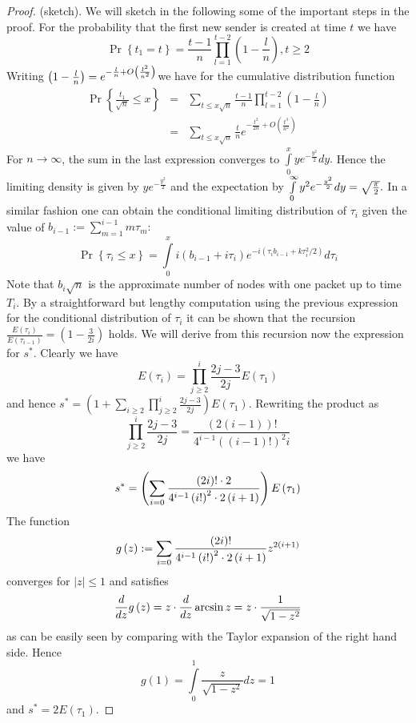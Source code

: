 \begin{proof}
(sketch). We will sketch in the following some of the important steps in the
proof. For the probability that the first new sender is created at time $t$
we have%
\[
\Pr \left\{ t_{1}=t\right\} =\frac{t-1}{n}\prod\limits_{l=1}^{t-2}\left( 1-%
\frac{l}{n}\right) ,t\geq 2
\]%
Writing $\left( 1-\frac{l}{n}\right) =e^{-\frac{l}{n}+O\left( \frac{l^{2}}{%
n^{2}}\right) }$we have for the cumulative distribution function 
\begin{eqnarray*}
\Pr \left\{ \frac{t_{1}}{\sqrt{n}}\leq x\right\}  &=&\sum\limits_{t\leq x%
\sqrt{n}}\frac{t-1}{n}\prod\limits_{l=1}^{t-2}\left( 1-\frac{l}{n}\right)  \\
&=&\sum\limits_{t\leq x\sqrt{n}}\frac{t}{n}e^{-\frac{t^{2}}{2n}+O\left( 
\frac{t^{3}}{n^{2}}\right) }
\end{eqnarray*}%
For $n\rightarrow \infty $, the sum in the last expression converges to $%
\int\limits_{0}^{x}ye^{-\frac{y^{2}}{2}}dy.$  Hence the limiting density is
given by $ye^{-\frac{y^{2}}{2}}$ and the expectation by $\int\limits_{0}^{%
\infty }y^{2}e^{-\frac{y^{2}}{2}}dy=\sqrt{\frac{\pi }{2}}.$ In a similar
fashion one can obtain the conditional limiting distribution of $\tau _{i}$
given the value of $b_{i-1}:=\sum\limits_{m=1}^{i-1}m\tau _{m}:$ 
\[
\Pr \left\{ \tau _{i}\leq x\right\} =\int\limits_{0}^{x}i\left(
b_{i-1}+i\tau _{i}\right) e^{-i\left( \tau _{i}b_{i-1}+k\tau
_{i}^{2}/2\right) }d\tau _{i}
\]%
Note that $b_{i}\sqrt{n}$ is the approximate number of nodes with one
packet up to time $T_{i}.$ By a straightforward but lengthy computation
using the previous expression for the conditional distribution of $\tau _{i}$
it can be shown that the recursion $\frac{E\left( \tau _{i}\right) }{E\left(
\tau _{i-1}\right) }=\left( 1-\frac{3}{2i}\right) $ holds. We will derive
from this recursion now the expression for $s^{\ast }.$ Clearly we have 
\[
E\left( \tau _{i}\right) =\prod\limits_{j\geq 2}^{i}\frac{2j-3}{2j}E\left(
\tau _{1}\right) 
\]%
and hence $s^{\ast }=\left( 1+\sum\limits_{i\geq 2}\prod\limits_{j\geq 2}^{i}%
\frac{2j-3}{2j}\right) E\left( \tau _{1}\right) .$ Rewriting the product as%
\[
\prod\limits_{j\geq 2}^{i}\frac{2j-3}{2j}=\frac{\left( 2\left( i-1\right)
\right) !}{4^{i-1}\left( \left( i-1\right) !\right) ^{2}i}
\]%
we have%
\[
s^{\ast }=\left( \sum\limits_{i=0}\frac{\left( 2i\right) !\cdot 2}{%
4^{i-1}\left( i!\right) ^{2}\cdot 2\left( i+1\right) }\right) E\left( \tau
_{1}\right) 
\]%
The function 
\[
g\left( z\right) :=\sum\limits_{i=0}\frac{\left( 2i\right) !}{%
4^{i-1}\left( i!\right) ^{2}\cdot 2\left( i+1\right) }z^{2\left( i+1\right) }
\]%
converges for $\left\vert z\right\vert \leq 1$ and satisfies%
\[
\frac{d}{dz}g\left( z\right) =z\cdot \frac{d}{dz}\arcsin z=z\cdot \frac{1}{%
\sqrt{1-z^{2}}}
\]%
as can be easily seen by comparing with the Taylor expansion of the right hand side. Hence 
\[
g\left( 1\right) =\int\limits_{0}^{1}\frac{z}{\sqrt{1-z^{2}}}dz=1
\]%
and $s^{\ast }=2E\left( \tau _{1}\right).$
\end{proof}

